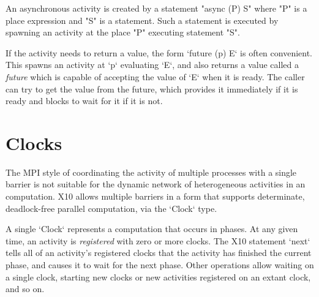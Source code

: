 An asynchronous activity is created by a statement \xcd"async (P) S"
where \xcd"P" is a place expression and \xcd"S" is a statement.  Such
a statement is executed by spawning an activity at the place
\xcd"P"  executing statement \xcd"S".

If the activity needs to return a value, the form \xcd`future (p) E` is often
convenient. This spawns an activity at \xcd`p` evaluating \xcd`E`, and also
returns a value called a {\em future} which is capable of accepting the value
of \xcd`E` when it is ready.  The caller can try to get the value from the
future, which provides it immediately if it is ready and blocks to wait for it
if it is not.



\section{Clocks}
The MPI style of coordinating the activity of multiple processes with
a single barrier is not suitable for the dynamic network of heterogeneous
activities in an \Xten{} computation.  
X10 allows multiple barriers in a form that supports determinate,
deadlock-free parallel computation, via the \xcd`Clock` type.

A single \xcd`Clock` represents a computation that occurs in phases.
At any given time, an activity is {\em registered} with zero or more clocks.
The X10 statement \xcd`next` tells all of an activity's registered clocks that
the activity has finished the current phase, and causes it to wait for the
next phase.  Other operations allow waiting on a single clock, starting
new clocks or new activities registered on an extant clock, and so on. 


